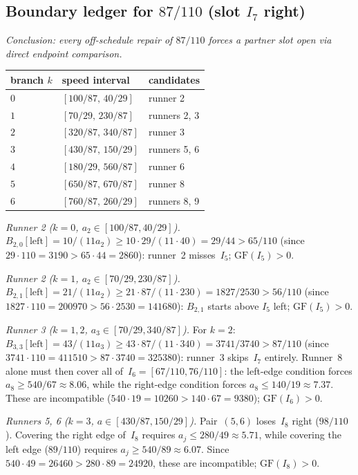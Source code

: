 \documentclass[12pt]{article}
\begin{document}
\subsection{Boundary ledger for $87/110$ (slot $I_7$ right)}

\emph{Conclusion: every off-schedule repair of $87/110$ forces a partner slot open via direct
endpoint comparison.}

\begin{center}
\begin{tabular}{@{}lll@{}}
\toprule
branch $k$ & speed interval & candidates \\
\midrule
$0$ & $[100/87,\,40/29]$ & runner 2 \\
$1$ & $[70/29,\,230/87]$ & runners 2, 3 \\
$2$ & $[320/87,\,340/87]$ & runner 3 \\
$3$ & $[430/87,\,150/29]$ & runners 5, 6 \\
$4$ & $[180/29,\,560/87]$ & runner 6 \\
$5$ & $[650/87,\,670/87]$ & runner 8 \\
$6$ & $[760/87,\,260/29]$ & runners 8, 9 \\
\bottomrule
\end{tabular}
\end{center}

\emph{Runner 2 ($k=0$, $a_2\in[100/87,40/29]$).}
$B_{2,0}[\mathrm{left}]=10/(11a_2)\ge10\cdot29/(11\cdot40)=29/44>65/110$
(since $29\cdot110=3190>65\cdot44=2860$): runner~2 misses~$I_5$; $\mathrm{GF}(I_5)>0$.

\emph{Runner 2 ($k=1$, $a_2\in[70/29,230/87]$).}
$B_{2,1}[\mathrm{left}]=21/(11a_2)\ge21\cdot87/(11\cdot230)=1827/2530>56/110$
(since $1827\cdot110=200970>56\cdot2530=141680$): $B_{2,1}$ starts above $I_5$ left;
$\mathrm{GF}(I_5)>0$.

\emph{Runner 3 ($k=1,2$, $a_3\in[70/29,340/87]$).}
For $k=2$: $B_{3,3}[\mathrm{left}]=43/(11a_3)\ge43\cdot87/(11\cdot340)=3741/3740>87/110$
(since $3741\cdot110=411510>87\cdot3740=325380$): runner~3 skips~$I_7$ entirely.
Runner~8 alone must then cover all of~$I_6=[67/110,76/110]$: the left-edge condition
forces $a_8\ge540/67\approx8.06$, while the right-edge condition forces
$a_8\le140/19\approx7.37$. These are incompatible ($540\cdot19=10260>140\cdot67=9380$);
$\mathrm{GF}(I_6)>0$.

\emph{Runners 5, 6 ($k=3$, $a\in[430/87,150/29]$).}
Pair~$(5,6)$ loses~$I_8$ right ($98/110$). Covering the right edge of~$I_8$ requires
$a_j\le280/49\approx5.71$, while covering the left edge ($89/110$) requires
$a_j\ge540/89\approx6.07$. Since $540\cdot49=26460>280\cdot89=24920$, these are
incompatible; $\mathrm{GF}(I_8)>0$.
\end{document}
